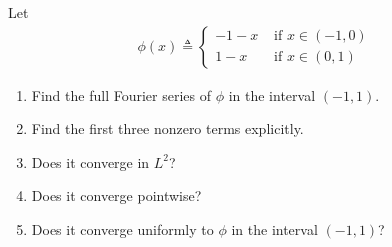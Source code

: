 \documentclass{report}
\begin{document}
\begin{question}{}{}
Let 
\begin{align*}
\phi (x)\triangleq \begin{cases}
  -1-x& \text{ if $x\in (-1,0)$ }\\
  1-x& \text{ if $x\in (0,1)$ }
\end{cases}
\end{align*}
\begin{enumerate}[label=(\alph*)]
  \item Find the full Fourier series of $\phi$ in the interval $(-1,1)$. 
  \item Find the first three nonzero terms explicitly. 
  \item Does it converge in $L^2$?  
  \item Does it converge pointwise? 
  \item Does it converge uniformly to $\phi$ in the interval $(-1,1)$? 
\end{enumerate}
\end{question}
\end{document}
